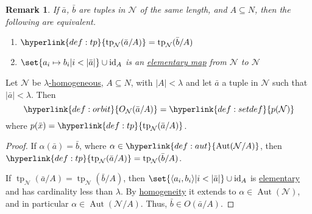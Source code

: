 \documentclass{article}
\let\models\vDash
\DeclareMathOperator{\Aut}{Aut}
\DeclareMathOperator{\tp}{tp}
\newtheorem{nremark}[nthm]{Remark}
\newcommand{\named}[1]{\textbf{#1}\index{#1}}
\begin{document}
\begin{nremark}\label{rem:6.12}
  If $\bar{a}$, $\bar{b}$ are tuples in $\mathcal{N}$ of the same length, and $A\subseteq N$, then the following are equivalent.
  \begin{enumerate}[label=(\roman*)]
    \item $\hyperlink{def:tp}{\tp_{\mathcal{N}}(\bar{a}/A)}= \tp_{\mathcal{N}}(\bar{b}/A)$
    \item $ \set{a_i\mapsto b_i|i < |\bar{a}|}\cup\text{id}_A $ is an \hyperlink{def:el}{elementary map} from $\mathcal{N}$ to $\mathcal{N}$
  \end{enumerate}
\end{nremark}
\begin{nprop}\label{prop:6.13}
  Let $ \mathcal{N} $ be \hyperlink{def:homogeneous}{$\lambda$-homogeneous}, $A\subseteq N$, with $|A|<\lambda$ and let $\bar{a}$ a tuple in $\mathcal{N}$ such that $|\bar{a}|<\lambda$.
  Then
  \begin{equation*}\hyperlink{def:orbit}{O_{\mathcal{N}}(\bar{a}/A)}=\hyperlink{def:setdef}{p(\mathcal{N})}\end{equation*}
  where $p(\bar{x})=\hyperlink{def:tp}{\tp_{\mathcal{N}}(\bar{a}/A)}$.
\end{nprop}
\begin{proof}
  If $\alpha(\bar{a})=\bar{b}$, where $\alpha\in\hyperlink{def:aut}{\Aut(\mathcal{N}/A)}$, then $\hyperlink{def:tp}{\tp_{\mathcal{N}}(\bar{a}/A)}=\tp_{\mathcal{N}}(\bar{b}/A) $.

  If $\tp_{\mathcal{N}}(\bar{a}/A)=\tp_{\mathcal{N}}(\bar{b}/A)$, then $\set{\langle a_i, b_i \rangle | i < |\bar{a}|} \cup \operatorname{id}_A$ is \hyperlink{def:elmap}{elementary} and has cardinality less than $\lambda$. By \hyperlink{def:homogeneous}{homogeneity} it extends to $\alpha\in\Aut(\mathcal{N})$, and in particular $\alpha \in \Aut(\mathcal{N}/A)$. Thus, $\bar b \in O(\bar a / A)$.
\end{proof}
\end{document}
